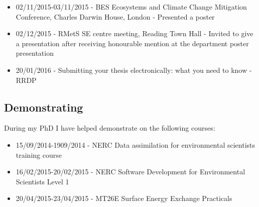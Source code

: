 \documentclass[11pt]{article}
\begin{document}
\begin{itemize}
\item 02/11/2015-03/11/2015 - BES Ecosystems and Climate Change Mitigation Conference, Charles Darwin House, London - Presented a poster

\item 02/12/2015 - RMetS SE centre meeting, Reading Town Hall - Invited to give a presentation after receiving honourable mention at the department poster presentation

\item 20/01/2016 - Submitting your thesis electronically: what you need to know - RRDP
\end{itemize}

\subsection{Demonstrating}
During my PhD I have helped demonstrate on the following courses:
\begin{itemize}
\item 15/09/2014-1909/2014 - NERC Data assimilation for environmental scientists training course

\item 16/02/2015-20/02/2015 - NERC Software Development for Environmental Scientists Level 1

\item 20/04/2015-23/04/2015 - MT26E Surface Energy Exchange Practicals
\end{itemize}


{}
%
\end{document}
